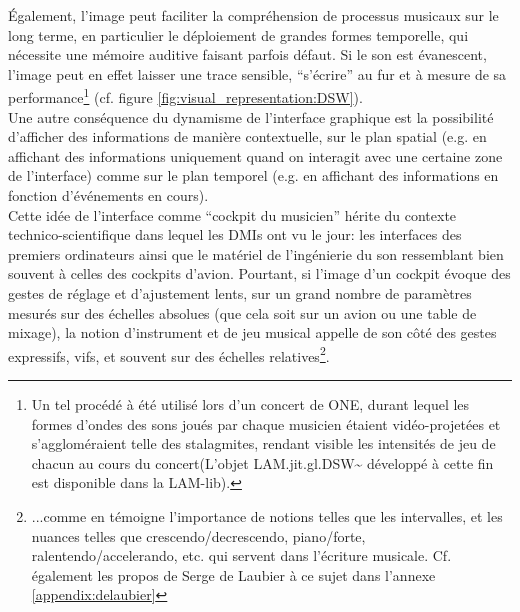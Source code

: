 \indent Également, l'image peut faciliter la compréhension de processus musicaux sur le long terme, en particulier le déploiement de grandes formes temporelle, qui nécessite une mémoire auditive faisant parfois défaut. Si le son est évanescent, l'image peut en effet laisser une trace sensible, ``s'écrire'' au fur et à mesure de sa performance\footnote{Un tel procédé à été utilisé lors d'un concert de ONE, durant lequel les formes d'ondes des sons joués par chaque musicien étaient vidéo-projetées et s'aggloméraient telle des stalagmites, rendant visible les intensités de jeu de chacun au cours du concert(L'objet LAM.jit.gl.DSW\textasciitilde{} développé à cette fin est disponible dans la LAM-lib).} (cf. figure \ref{fig:visual_representation:DSW}).\\
\indent Une autre conséquence du dynamisme de l'interface graphique est la possibilité d'afficher des informations de manière contextuelle, sur le plan spatial (e.g. en affichant des informations uniquement quand on interagit avec une certaine zone de l'interface) comme sur le plan temporel (e.g. en affichant des informations en fonction d'événements en cours).\\
\indent Cette idée de l'interface comme ``cockpit du musicien'' \cite{vertegaal_towards_1996} hérite du contexte technico-scientifique dans lequel les \glspl{DMI} ont vu le jour: les interfaces des premiers ordinateurs ainsi que le matériel de l'ingénierie du son ressemblant bien souvent à celles des cockpits d'avion. Pourtant, si l'image d'un cockpit évoque des gestes de réglage et d'ajustement lents, sur un grand nombre de paramètres mesurés sur des échelles absolues (que cela soit sur un avion ou une table de mixage), la notion d'instrument et de jeu musical appelle de son côté des gestes expressifs, vifs, et souvent sur des échelles relatives\footnote{...comme en témoigne l'importance de notions telles que les intervalles, et les nuances telles que crescendo/decrescendo, piano/forte, ralentendo/accelerando, etc. qui servent dans l'écriture musicale. Cf. également les propos de Serge de Laubier à ce sujet dans l'annexe \ref{appendix:delaubier}
}.

